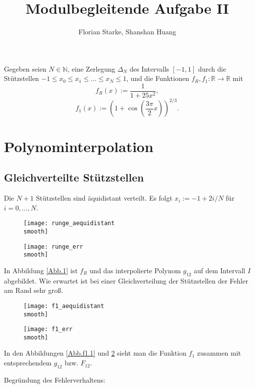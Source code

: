 \documentclass[]{scrartcl}
\title{Modulbegleitende Aufgabe II}
\author{Florian Starke, Shanshan Huang}
\newcommand{\R}{\mathbb{R}}
\newcommand{\N}{\mathbb{N}}
\begin{document}
\def\smooth{_smooth}
	\maketitle
	Gegeben seien $N\in\N$, eine Zerlegung $\Delta_N$ des Intervalls $[-1,1]$ durch die Stützstellen $-1\leq x_0\leq x_1\leq\dots\leq x_N\leq1$, und die Funktionen $f_R,f_1\colon\R\to\R$ mit
	\[f_R(x):=\frac{1}{1+25x^2},\]
	\[f_1(x):=(1+\cos(\frac{3\pi}{2}x))^{2/3}.\]
	\section{Polynominterpolation}
	\subsection{Gleichverteilte Stützstellen}
	Die $N+1$ Stützstellen sind äquidistant verteilt. Es folgt $x_i:=-1+2i/N$ für $i=0,\dots,N$.
	\begin{figure}[H]
		\centering
		\begin{minipage}{0.5\textwidth}
			\texttt{[image: runge\_aequidistant\\smooth]}
			\caption{\label{Abb.1}}
		\end{minipage}
		\begin{minipage}{0.49\textwidth}
			\texttt{[image: runge\_err\\smooth]}
			\caption{\label{Abb.2}}
		\end{minipage}
	\end{figure}
	
	In Abbildung \ref{Abb.1} ist $f_R$ und das interpolierte Polynom $g_{12}$ auf dem Intervall $I$ abgebildet. Wie erwartet ist bei einer Gleichverteilung der Stützstellen der Fehler am Rand sehr groß.
	
	\begin{figure}[H]
		\centering
		\begin{minipage}{0.5\textwidth}
			\texttt{[image: f1\_aequidistant\\smooth]}
			\caption{\label{Abb.f1.1}}
		\end{minipage}
		\begin{minipage}{0.49\textwidth}
			\texttt{[image: f1\_err\\smooth]}
			\caption{\label{Abb.f1.2}}
		\end{minipage}
	\end{figure}
	In den Abbildungen \ref{Abb.f1.1} und \ref{Abb.f1.2} sieht man die Funktion $f_1$ zusammen mit entsprechendem $g_{12}$ bzw. $F_{12}$.
	
	
	Begründung des Fehlerverhaltens:
	
\end{document}
